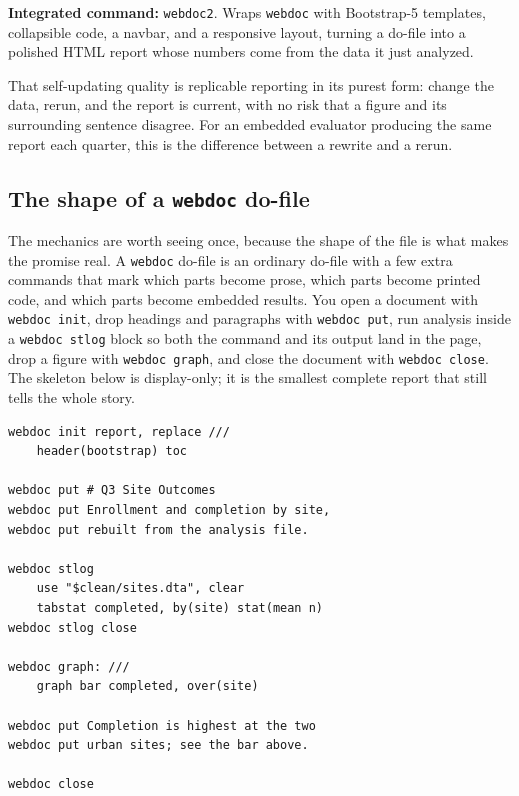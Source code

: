\documentclass[
    a4paper,
    fontsize=10pt,
    twoside=true,
    numbers=noenddot,
]{kaobook}
\begin{document}
\begin{kaobox}[frametitle=Package Integration: \texttt{webdoc2}]
\textbf{Integrated command:} \texttt{webdoc2}. Wraps \texttt{webdoc} with Bootstrap-5 templates, collapsible code, a navbar, and a responsive layout, turning a do-file into a polished HTML report whose numbers come from the data it just analyzed.
\end{kaobox}

That self-updating quality is replicable reporting in its purest form: change the data, rerun, and the report is current, with no risk that a figure and its surrounding sentence disagree. For an embedded evaluator producing the same report each quarter, this is the difference between a rewrite and a rerun.

\subsection{The shape of a \texttt{webdoc} do-file}
The mechanics are worth seeing once, because the shape of the file is what makes the promise real. A \texttt{webdoc} do-file is an ordinary do-file with a few extra commands that mark which parts become prose, which parts become printed code, and which parts become embedded results. You open a document with \texttt{webdoc init}, drop headings and paragraphs with \texttt{webdoc put}, run analysis inside a \texttt{webdoc stlog} block so both the command and its output land in the page, drop a figure with \texttt{webdoc graph}, and close the document with \texttt{webdoc close}. The skeleton below is display-only; it is the smallest complete report that still tells the whole story.
{\footnotesize
\begin{verbatim}
webdoc init report, replace ///
    header(bootstrap) toc

webdoc put # Q3 Site Outcomes
webdoc put Enrollment and completion by site,
webdoc put rebuilt from the analysis file.

webdoc stlog
    use "$clean/sites.dta", clear
    tabstat completed, by(site) stat(mean n)
webdoc stlog close

webdoc graph: ///
    graph bar completed, over(site)

webdoc put Completion is highest at the two
webdoc put urban sites; see the bar above.

webdoc close
\end{verbatim}
}
\end{document}
